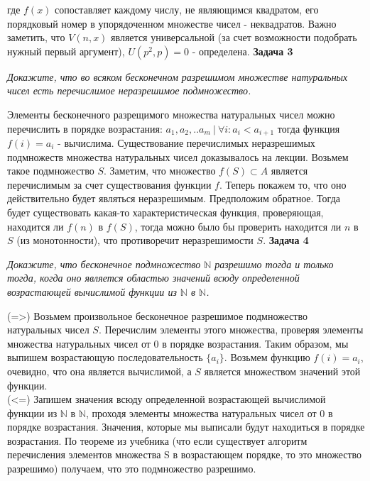 \documentclass{article}
\begin{document}
 где $f(x)$ сопоставляет каждому числу, не являющимся квадратом, его порядковый номер в упорядоченном множестве чисел - неквадратов. Важно заметить, что $V(n,x)$ является универсальной (за счет возможности подобрать нужный первый аргумент), $U(p^2,p)=0$ - определена.  
 \newline
 \newline
\textbf{Задача 3}
\begin{center}
\textit{Докажите, что во всяком бесконечном разрешимом множестве натуральных чисел есть перечислимое неразрешимое подмножество.} 
\end{center}
Элементы бесконечного разрещимого множества натуральных чисел можно перечислить в порядке возрастания: $a_1, a_2,..a_m ~|~ \forall i: a_i<a_{i+1}$ тогда функция $f(i)=a_i$ - вычислима. Существование перечислимых неразрешимых подмножеств множества натуральных чисел доказывалось на лекции. Возьмем такое подмножество $S$. Заметим, что множество $f(S) \subset A$ является перечислимым за счет существования функции $f$. Теперь покажем то, что оно действительно будет являться неразрешимым. Предположим обратное. Тогда будет существовать какая-то характеристическая функция, проверяющая, находится ли $f(n)$ в $ f(S)$, тогда можно было бы проверить находится ли $n$ в $S$ (из монотонности), что противоречит неразрешимости $S$.
\newline
\newline
\noindent \textbf{Задача 4}
\begin{center}
\textit{Докажите, что бесконечное подмножество $\mathbb{N}$ разрешимо тогда и только тогда, когда оно является областью значений всюду определенной возрастающей вычислимой функции из $\mathbb{N}$ в $\mathbb{N}$.}
\end{center}
(=>) Возьмем произвольное бесконечное разрешимое подмножество натуральных чисел $S$. Перечислим элементы этого множества, проверяя элементы множества натуральных чисел от 0 в порядке возрастания. Таким образом, мы выпишем возрастающую последовательность $\{a_i\}$. Возьмем функцию $f(i)=a_i$, очевидно, что она является вычислимой, а $S$ является множеством значений этой функции.\\
(<=) Запишем значения всюду определенной возрастающей вычислимой функции из $\mathbb{N}$ в $\mathbb{N}$, проходя элементы множества натуральных чисел от 0 в порядке возрастания. Значения, которые мы выписали будут находиться в порядке возрастания. По теореме из учебника (что если существует алгоритм перечисления элементов множества S в возрастающем порядке, то это множество разрешимо) получаем, что это подмножество разрешимо.
\end{document}
